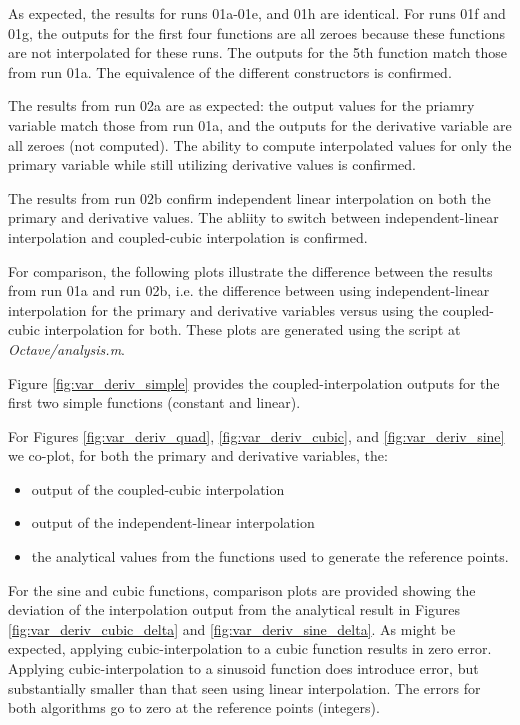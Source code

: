 \documentclass[11pt,fleqn]{report}
\begin{document}
As expected, the results for runs 01a-01e, and 01h are identical. For runs 01f
and 01g, the outputs for the first four functions are all zeroes because these
functions are not interpolated for these runs. The outputs for the 5th function
match those from run 01a. The equivalence of the different constructors is
confirmed.

The results from run 02a are as expected: the output values for the priamry
variable match those from run 01a, and the outputs for the derivative variable
are all zeroes (not computed). The ability to compute interpolated values for
only the primary variable while still utilizing derivative values is confirmed.

The results from run 02b confirm independent linear interpolation on both the
primary and derivative values. The abliity to switch between independent-linear
interpolation and coupled-cubic interpolation is confirmed.

For comparison, the following plots illustrate the difference between the
results from run 01a and run 02b, i.e. the difference between using
independent-linear interpolation for the primary and derivative variables
versus using the coupled-cubic interpolation for both. These plots are
generated using the script at \textit{Octave/analysis.m}.

Figure \ref{fig:var_deriv_simple} provides the coupled-interpolation outputs
for the first two simple functions (constant and linear).

For Figures \ref{fig:var_deriv_quad}, \ref{fig:var_deriv_cubic}, and
\ref{fig:var_deriv_sine} we co-plot, for both the primary and derivative
variables, the:
\begin{itemize}
  \item output of the coupled-cubic interpolation
  \item output of the independent-linear interpolation
  \item the analytical values from the functions used to generate the reference
  points.
\end{itemize}

For the sine and cubic functions, comparison plots are provided showing the
deviation of the interpolation output from the analytical result in Figures
\ref{fig:var_deriv_cubic_delta} and \ref{fig:var_deriv_sine_delta}.
As might be expected, applying cubic-interpolation to a cubic function
results in zero error. Applying cubic-interpolation to a sinusoid function does
introduce error, but substantially smaller than that seen using linear
interpolation. The errors for both algorithms go to zero at the reference
points (integers).
\end{document}
